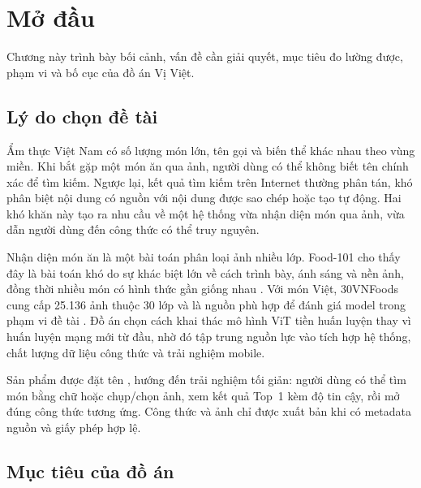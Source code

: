 \chapter{Mở đầu}
\label{ch:modau}

\begin{muctieu}
Chương này trình bày bối cảnh, vấn đề cần giải quyết, mục tiêu đo lường được,
phạm vi và bố cục của đồ án Vị Việt.
\end{muctieu}

\section{Lý do chọn đề tài}

Ẩm thực Việt Nam có số lượng món lớn, tên gọi và biến thể khác nhau theo vùng
miền. Khi bắt gặp một món ăn qua ảnh, người dùng có thể không biết tên chính
xác để tìm kiếm. Ngược lại, kết quả tìm kiếm trên Internet thường phân tán,
khó phân biệt nội dung có nguồn với nội dung được sao chép hoặc tạo tự động.
Hai khó khăn này tạo ra nhu cầu về một hệ thống vừa nhận diện món qua ảnh,
vừa dẫn người dùng đến công thức có thể truy nguyên.

Nhận diện món ăn là một bài toán phân loại ảnh nhiều lớp. Food-101 cho thấy
đây là bài toán khó do sự khác biệt lớn về cách trình bày, ánh sáng và nền
ảnh, đồng thời nhiều món có hình thức gần giống nhau
\cite{bossard2014food101}. Với món Việt, 30VNFoods cung cấp 25.136 ảnh thuộc
30 lớp và là nguồn phù hợp để đánh giá model trong phạm vi đề tài
\cite{do2021_30vnfoods}. Đồ án chọn cách khai thác mô hình ViT tiền huấn luyện
thay vì huấn luyện mạng mới từ đầu, nhờ đó tập trung nguồn lực vào tích hợp
hệ thống, chất lượng dữ liệu công thức và trải nghiệm mobile.

Sản phẩm được đặt tên , hướng đến trải nghiệm tối giản: người
dùng có thể tìm món bằng chữ hoặc chụp/chọn ảnh, xem kết quả Top~1 kèm độ tin
cậy, rồi mở đúng công thức tương ứng. Công thức và ảnh chỉ được xuất bản khi
có metadata nguồn và giấy phép hợp lệ.

\section{Mục tiêu của đồ án}

